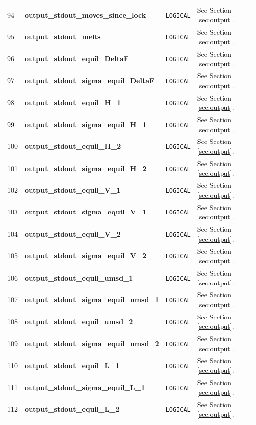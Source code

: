 \documentclass{report}
\begin{document}
\begin{landscape}
\begin{center}
\begin{longtable}{l l l p{8cm}}
94 & \textbf{output\_stdout\_moves\_since\_lock}  &  \texttt{LOGICAL}  & See Section \ref{sec:output}. \\
95 & \textbf{output\_stdout\_melts}  &  \texttt{LOGICAL}  & See Section \ref{sec:output}. \\
96 & \textbf{output\_stdout\_equil\_DeltaF}  &  \texttt{LOGICAL}  & See Section \ref{sec:output}. \\
97 & \textbf{output\_stdout\_sigma\_equil\_DeltaF}  &  \texttt{LOGICAL}  & See Section \ref{sec:output}. \\
98 & \textbf{output\_stdout\_equil\_H\_1}  &  \texttt{LOGICAL}  & See Section \ref{sec:output}. \\
99 & \textbf{output\_stdout\_sigma\_equil\_H\_1}  &  \texttt{LOGICAL}  & See Section \ref{sec:output}. \\
100 & \textbf{output\_stdout\_equil\_H\_2}  &  \texttt{LOGICAL}  & See Section \ref{sec:output}. \\
101 & \textbf{output\_stdout\_sigma\_equil\_H\_2}  &  \texttt{LOGICAL}  & See Section \ref{sec:output}. \\
102 & \textbf{output\_stdout\_equil\_V\_1}  &  \texttt{LOGICAL}  & See Section \ref{sec:output}. \\
103 & \textbf{output\_stdout\_sigma\_equil\_V\_1}  &  \texttt{LOGICAL}  & See Section \ref{sec:output}. \\
104 & \textbf{output\_stdout\_equil\_V\_2}  &  \texttt{LOGICAL}  & See Section \ref{sec:output}. \\
105 & \textbf{output\_stdout\_sigma\_equil\_V\_2}  &  \texttt{LOGICAL}  & See Section \ref{sec:output}. \\
106 & \textbf{output\_stdout\_equil\_umsd\_1}  &  \texttt{LOGICAL}  & See Section \ref{sec:output}. \\
107 & \textbf{output\_stdout\_sigma\_equil\_umsd\_1}  &  \texttt{LOGICAL}  & See Section \ref{sec:output}. \\
108 & \textbf{output\_stdout\_equil\_umsd\_2}  &  \texttt{LOGICAL}  & See Section \ref{sec:output}. \\
109 & \textbf{output\_stdout\_sigma\_equil\_umsd\_2}  &  \texttt{LOGICAL}  & See Section \ref{sec:output}. \\
110 & \textbf{output\_stdout\_equil\_L\_1} &  \texttt{LOGICAL}  & See Section \ref{sec:output}. \\
111 & \textbf{output\_stdout\_sigma\_equil\_L\_1} &  \texttt{LOGICAL}  & See Section \ref{sec:output}. \\
112 & \textbf{output\_stdout\_equil\_L\_2} &  \texttt{LOGICAL}  & See Section \ref{sec:output}. \\

\end{longtable}
\end{center}
\end{landscape}
\end{document}
